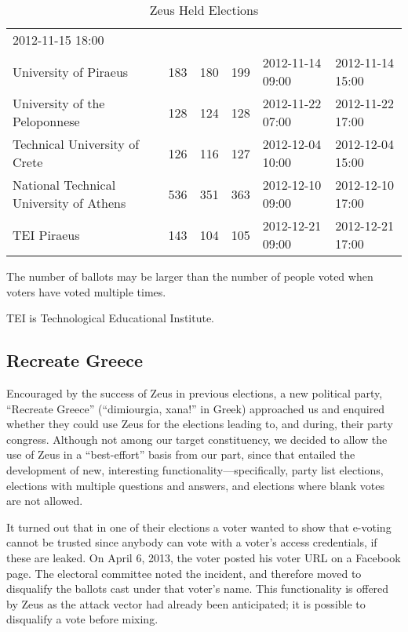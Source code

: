 \documentclass[letterpaper,10pt]{article}
\begin{document}
\begin{table*}[t]
\begin{threeparttable}
\begin{tabular}{llllll}
      2012-11-15 18:00\\
      University of Piraeus & 183 & 180 & 199 & 2012-11-14 09:00 & 
      2012-11-14 15:00\\
      University of the Peloponnese & 128 & 124 & 128 &
      2012-11-22 07:00 & 2012-11-22 17:00\\
      Technical University of Crete & 126 & 116 & 127 & 
      2012-12-04 10:00 & 2012-12-04 15:00\\
      National Technical University of Athens & 536 & 351 & 363 &
      2012-12-10 09:00 & 2012-12-10 17:00\\
      TEI Piraeus & 143 & 104 & 105 & 2012-12-21 09:00 & 2012-12-21 17:00\\
    \end{tabular}
    \begin{tablenotes}
      \small 
      \item The number of ballots may be larger than the number of
      people voted when voters have voted multiple times.
      \item TEI is Technological Educational Institute. 
    \end{tablenotes}
  \end{threeparttable}
  \caption{Zeus Held Elections\label{table:zeus-elections}}
\end{table*}

\subsection{Recreate Greece}

Encouraged by the success of Zeus in previous elections, a new
political party, ``Recreate Greece'' (``dimiourgia, xana!'' in Greek)
approached us and enquired whether they could use Zeus for the
elections leading to, and during, their party congress. Although not
among our target constituency, we decided to allow the use of Zeus in
a ``best-effort'' basis from our part, since that entailed the
development of new, interesting functionality---specifically, party
list elections, elections with multiple questions and answers, and
elections where blank votes are not allowed.

It turned out that in one of their elections a voter wanted to show
that e-voting cannot be trusted since anybody can vote with a voter's
access credentials, if these are leaked. On April 6, 2013, the voter
posted his voter URL on a Facebook page. The electoral committee noted
the incident, and therefore moved to disqualify the ballots cast under
that voter's name. This functionality is offered by Zeus as the attack
vector had already been anticipated; it is possible to disqualify a
vote before mixing.
\end{document}
